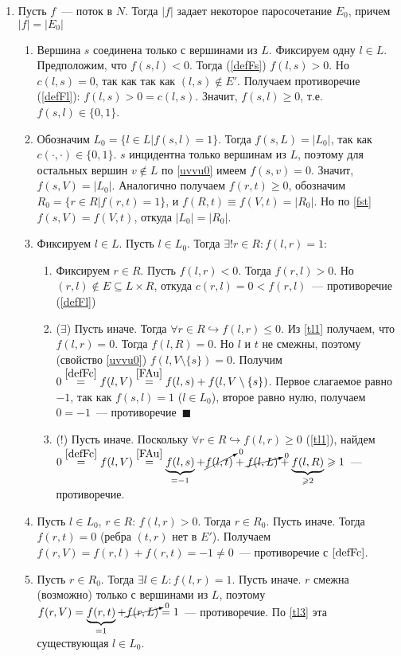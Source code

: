 \documentclass[a4paper]{article}
\begin{document}
\begin{enumerate}
\item \label{l1} Пусть $f$~--- поток в $N$. Тогда $|f|$ задает некоторое паросочетание $E_0$, причем $|f|=|E_0|$\begin{enumerate}
\item Вершина $s$ соединена только с вершинами из $L$. Фиксируем одну $l\in L$. Предположим, что $f(s,l)<0$. Тогда (\ref{defFs}) $f(l,s)>0$. Но $c(l,s)=0$, так как так как $(l,s)\notin E'$. Получаем противоречие (\ref{defFl}): $f(l,s)>0=c(l,s)$. Значит, $f(s,l)\geqslant 0$, т.е. $f(s,l)\in \{0,1\}$.
\item \label{tl5} Обозначим $L_0=\{l\in L\big| f(s,l)=1\}$. Тогда $f(s,L)=|L_0|$, так как $c(\cdot,\cdot)\in\{0,1\}$. $s$ инцидентна только вершинам из $L$, поэтому для остальных вершин $v\notin L$ по \ref{uvvu0} имеем $f(s,v)=0$. Значит, $f(s,V)=|L_0|$. Аналогично получаем $f(r,t)\geqslant 0$, обозначим $R_0=\{r\in R\big| f(r,t)=1\}$, и $f(R,t)\equiv f(V,t)=|R_0|$. Но по \ref{fst} $f(s,V)=f(V,t)$, откуда $|L_0|=|R_0|$.
\item \label{tl2} Фиксируем $l\in L$. Пусть $l\in L_0$. Тогда $\exists!r\in R\colon f(l,r)=1$:\begin{enumerate}
\item \label{tl1} Фиксируем $r\in R$. Пусть $f(l,r)<0$. Тогда $f(r,l)>0$. Но $(r,l)\notin E\subseteq L\times R$, откуда $c(r,l)=0<f(r,l)$~--- противоречие (\ref{defFl})
\item ($\exists$) Пусть иначе. Тогда $\forall r\in R\hookrightarrow f(l,r)\leqslant 0$. Из \ref{tl1} получаем, что $f(l,r)=0$. Тогда $f(l,R)=0$. Но $l$ и $t$ не смежны, поэтому (свойство \ref{uvvu0}) $f(l,V\setminus\{s\})=0$. Получим $0\overset{\ref{defFc}}{=}f(l,V)\overset{\ref{FAu}}{=}f(l,s)+f(l,V\setminus\{s\})$. Первое слагаемое равно $-1$, так как $f(s,l)=1$ ($l\in L_0$), второе равно нулю, получаем $0=-1$~--- противоречие $\,\blacksquare$
\item ($!$) Пусть иначе. Поскольку $\forall r\in R\hookrightarrow f(l,r)\geqslant 0$ (\ref{tl1}), найдем $0\overset{\ref{defFc}}{=}f(l,V)\overset{\ref{FAu}}{=}\underbrace{f(l,s)}_{=-1}+\cancelto{0}{f(l,t)}+\cancelto{0}{f(l,L)}+\underbrace{f(l,R)}_{\geqslant 2}\geqslant 1$~--- противоречие.
\end{enumerate}
\item \label{tl3} Пусть $l\in L_0$, $r\in R$: $f(l,r)>0$. Тогда $r\in R_0$. Пусть иначе. Тогда $f(r,t)=0$ (ребра $(t,r)$ нет в $E'$). Получаем $f(r,V)=f(r,l)+f(r,t)=-1\neq 0$~--- противоречие с $\ref{defFc}$.
\item \label{tl4} Пусть $r\in R_0$. Тогда $\exists l\in L\colon f(l,r)=1$. Пусть иначе. $r$ смежна (возможно) только с вершинами из $L$, поэтому $f(r,V)=\underbrace{f(r,t)}_{=1}+\cancelto{0}{f(r,L)}=1$~--- противоречие. По \ref{tl3} эта существующая $l\in L_0$.

\end{enumerate}
\end{enumerate}
\end{document}
